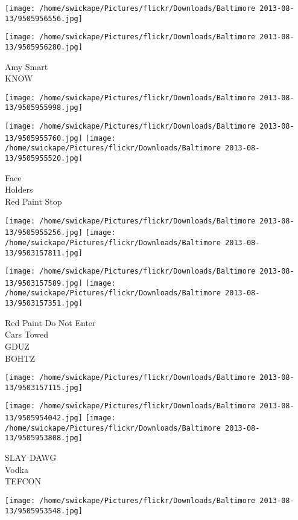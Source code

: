 \documentclass[10pt,letterpaper]{article}
\begin{document}
\texttt{[image: /home/swickape/Pictures/flickr/Downloads/Baltimore 2013-08-13/9505956556.jpg]}

\vspace{0.25in}
\texttt{[image: /home/swickape/Pictures/flickr/Downloads/Baltimore 2013-08-13/9505956280.jpg]}

Amy Smart\\
KNOW
\pagebreak

\texttt{[image: /home/swickape/Pictures/flickr/Downloads/Baltimore 2013-08-13/9505955998.jpg]}

\vspace{0.25in}
\texttt{[image: /home/swickape/Pictures/flickr/Downloads/Baltimore 2013-08-13/9505955760.jpg]}
\texttt{[image: /home/swickape/Pictures/flickr/Downloads/Baltimore 2013-08-13/9505955520.jpg]}

Face\\
Holders\\
Red Paint Stop
\pagebreak

\texttt{[image: /home/swickape/Pictures/flickr/Downloads/Baltimore 2013-08-13/9505955256.jpg]}
\texttt{[image: /home/swickape/Pictures/flickr/Downloads/Baltimore 2013-08-13/9503157811.jpg]}

\texttt{[image: /home/swickape/Pictures/flickr/Downloads/Baltimore 2013-08-13/9503157589.jpg]}
\texttt{[image: /home/swickape/Pictures/flickr/Downloads/Baltimore 2013-08-13/9503157351.jpg]}

Red Paint Do Not Enter\\
Cars Towed\\
GDUZ\\
BOHTZ
\pagebreak

\texttt{[image: /home/swickape/Pictures/flickr/Downloads/Baltimore 2013-08-13/9503157115.jpg]}

\vspace{0.25in}
\texttt{[image: /home/swickape/Pictures/flickr/Downloads/Baltimore 2013-08-13/9505954042.jpg]}
\texttt{[image: /home/swickape/Pictures/flickr/Downloads/Baltimore 2013-08-13/9505953808.jpg]}

SLAY DAWG\\
Vodka\\
TEFCON
\pagebreak

\texttt{[image: /home/swickape/Pictures/flickr/Downloads/Baltimore 2013-08-13/9505953548.jpg]}
\end{document}
